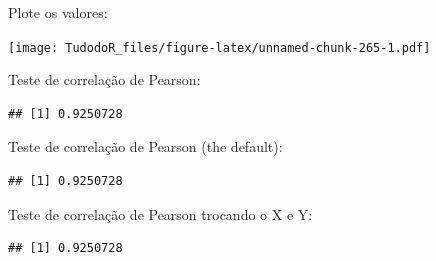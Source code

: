 \documentclass[
]{book}
\newenvironment{Shaded}{\begin{snugshade}}{\end{snugshade}}
\newcommand{\DataTypeTok}[1]{\textcolor[rgb]{0.13,0.29,0.53}{#1}}
\newcommand{\DecValTok}[1]{\textcolor[rgb]{0.00,0.00,0.81}{#1}}
\newcommand{\KeywordTok}[1]{\textcolor[rgb]{0.13,0.29,0.53}{\textbf{#1}}}
\newcommand{\NormalTok}[1]{#1}
\newcommand{\OperatorTok}[1]{\textcolor[rgb]{0.81,0.36,0.00}{\textbf{#1}}}
\newcommand{\StringTok}[1]{\textcolor[rgb]{0.31,0.60,0.02}{#1}}
\begin{document}
Plote os valores:

\begin{Shaded}
\end{Shaded}

\texttt{[image: TudodoR\_files/figure-latex/unnamed-chunk-265-1.pdf]}

Teste de correlação de Pearson:

\begin{Shaded}
\end{Shaded}

\begin{verbatim}
## [1] 0.9250728
\end{verbatim}

Teste de correlação de Pearson (the default):

\begin{Shaded}
\end{Shaded}

\begin{verbatim}
## [1] 0.9250728
\end{verbatim}

Teste de correlação de Pearson trocando o X e Y:

\begin{Shaded}
\end{Shaded}

\begin{verbatim}
## [1] 0.9250728
\end{verbatim}
\end{document}
